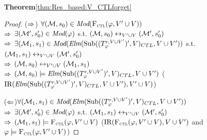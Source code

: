 \documentclass{article}
\begin{document}
\textbf{Theorem}\ref{thm:Res_based:V_CTLforget}
\begin{proof}
 ($\Rightarrow$) $\forall ({\cal M},s_0) \in \textit{Mod}({\textsc{F}_{\textsc{ctl}}}(\varphi, V' \cup V))$\\
 $\Rightarrow$ $\exists ({\cal M}',s_0') \in \textit{Mod}(\varphi)$ s.t. $({\cal M},s_0) \leftrightarrow_{V'\cup V} ({\cal M}', s_0')$\\
 $\Rightarrow$ $\exists ({\cal M}_1, s_1) \in \textit{Mod}(\textit{Elm} (\textrm{Sub}((T_{\varphi}^{r,V \cup V'})', V)_{CTL}, V \cup V'))$ s.t. $({\cal M}_1,s_1) \leftrightarrow_{V'\cup V} ({\cal M}', s_0')$\\
 $\Rightarrow$ $({\cal M},s_0) \leftrightarrow_{V'\cup V} ({\cal M}_1,s_1)$\\
 $\Rightarrow$ $({\cal M},s_0) \models \textit{Elm} (\textrm{Sub}((T_{\varphi}^{r,V \cup V'})', V)_{CTL}, V \cup V')$ \hfill ($\textrm{IR}(\textit{Elm} (\textrm{Sub}((T_{\varphi}^{r,V \cup V'})', V)_{CTL}, V \cup V'), V' \cup V)$)

 ($\Leftarrow$)$\forall ({\cal M}_1, s_1) \in \textit{Mod}(\textit{Elm} (\textrm{Sub}((T_{\varphi}^{r,V \cup V'})', V)_{CTL}, V \cup V'))$\\
 $\Rightarrow$ $\exists ({\cal M}',s_0') \in \textit{Mod}(\varphi)$ s.t. $({\cal M}_1,s_1) \leftrightarrow_{V'\cup V} ({\cal M}', s_0')$ \\
 $\Rightarrow$ $({\cal M}_1, s_1) \models {\textsc{F}_{\textsc{ctl}}}(\varphi, V' \cup V)$ \hfill ($\textrm{IR}({\textsc{F}_{\textsc{ctl}}}(\varphi, V' \cup V), V \cup V')$ and $\varphi \models {\textsc{F}_{\textsc{ctl}}}(\varphi, V' \cup V)$)
\end{proof}




\end{document}
